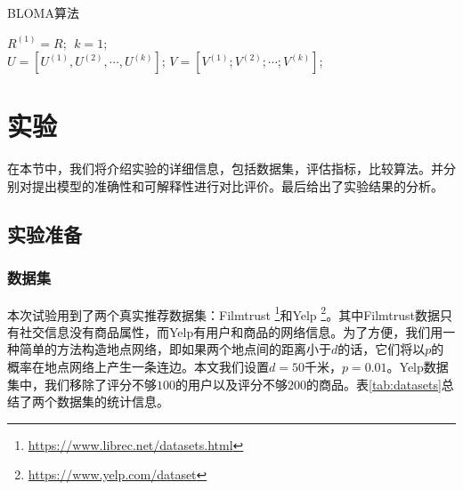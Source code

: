 \begin{algorithm}[!t]
\caption{BLOMA算法}
\label{algorithm}
{}
\BlankLine
$R^{(1)} = R; ~~k=1$;\\
$U = [U^{(1)}, U^{(2)}, \cdots, U^{(k)}]$; $V = [V^{(1)}; V^{(2)}; \cdots; V^{(k)}]$;\\
\end{algorithm}


\section{实验}
在本节中，我们将介绍实验的详细信息，包括数据集，评估指标，比较算法。并分别对提出模型的准确性和可解释性进行对比评价。最后给出了实验结果的分析。

\subsection{实验准备}

\subsubsection{数据集}
本次试验用到了两个真实推荐数据集：Filmtrust \footnote{\url{https://www.librec.net/datasets.html}}和Yelp \footnote{\url{https://www.yelp.com/dataset}}。其中Filmtrust数据只有社交信息没有商品属性，而Yelp有用户和商品的网络信息。为了方便，我们用一种简单的方法构造地点网络，即如果两个地点间的距离小于$d$的话，它们将以$p$的概率在地点网络上产生一条连边。本文我们设置$d=50$千米，$p = 0.01$。Yelp数据集中，我们移除了评分不够$100$的用户以及评分不够$200$的商品。表\ref{tab:datasets}总结了两个数据集的统计信息。

